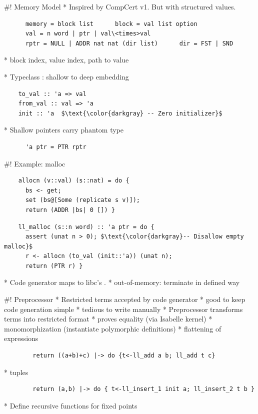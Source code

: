 \documentclass[fleqn]{beamer}
\begin{document}
#! Memory Model
  * Inspired by CompCert v1. But with structured values.

    \begin{lstlisting}
      memory = block list      block = val list option
      val = n word | ptr | val\<times>val
      rptr = NULL | ADDR nat nat (dir list)      dir = FST | SND
    \end{lstlisting}

    *  block index, value index, path to value

  \pause

  * Typeclass : shallow to deep embedding
    \begin{lstlisting}
    to_val :: 'a => val
    from_val :: val => 'a
    init :: 'a  $\text{\color{darkgray} -- Zero initializer}$
    \end{lstlisting}

  \pause

  * Shallow pointers carry phantom type
    \begin{lstlisting}
      'a ptr = PTR rptr
    \end{lstlisting}


#! Example: malloc
  \begin{lstlisting}
    allocn (v::val) (s::nat) = do {
      bs <- get;
      set (bs@[Some (replicate s v)]);
      return (ADDR |bs| 0 []) }
  \end{lstlisting}
  \pause

  \begin{lstlisting}
    ll_malloc (s::n word) :: 'a ptr = do {
      assert (unat n > 0); $\text{\color{darkgray}-- Disallow empty malloc}$
      r <- allocn (to_val (init::'a)) (unat n);
      return (PTR r) }
  \end{lstlisting}
  \pause

  * Code generator maps  to libc's .
    * out-of-memory: terminate in defined way 

\renewcommand{\insertsectitle}{\color{blue}{Basic Layer}}

#! Preprocessor
  * Restricted terms accepted by code generator
    * good to keep code generation simple
    * tedious to write manually
  \pause
  * Preprocessor transforms terms into restricted format
      \pause
    * proves equality (via Isabelle kernel)
      \pause
    * monomorphization (instantiate polymorphic definitions)
      \pause
    * flattening of expressions
      \begin{lstlisting}
        return ((a+b)+c) |-> do {t<-ll_add a b; ll_add t c}
      \end{lstlisting}
      \pause
    * tuples
      \begin{lstlisting}
        return (a,b) |-> do { t<-ll_insert_1 init a; ll_insert_2 t b }
      \end{lstlisting}
      \pause
    * Define recursive functions for fixed points
\end{document}
